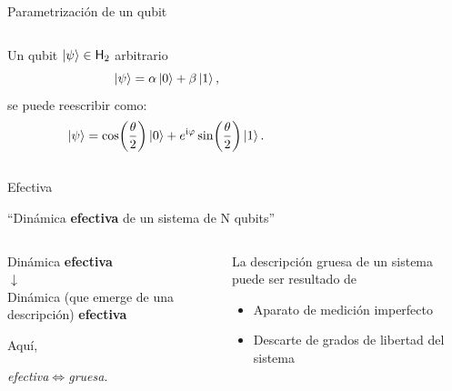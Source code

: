 \begin{frame}{Parametrización de un qubit}
    \begin{columns}
        \begin{column}{0.5\textwidth}
            Un qubit $\ket{\psi}\in{\sf H}_{2}$ arbitrario
            \begin{equation}
                \ket{\psi}=\alpha\ket{0}+\beta\ket{1},\nonumber
            \end{equation}
            \pause
            se puede reescribir como:
            \begin{equation}
                \ket{\psi}=\cos(\frac{\theta}{2})\ket{0}+e^{\text{i}\varphi}\sin(\frac{\theta}{2})\ket{1}.\nonumber
            \end{equation}
        \end{column}
        \begin{column}{0.5\textwidth}
            \centering
            \BlochSphere
        \end{column}
    \end{columns}
\end{frame}



\begin{frame}{Efectiva}
    \begin{center}
        ``Dinámica \textbf{efectiva} de un sistema de N qubits''
    \end{center}
    \pause
    \begin{columns}
        \begin{column}{0.5\textwidth}
            \begin{center}
                Dinámica \textbf{efectiva}\\
                \pause
                $\downarrow$\\
                Dinámica {\tiny(que emerge de una descripción)} \textbf{efectiva}
            \end{center}
            \pause
            Aquí, 
            \begin{center}
                \textit{efectiva}$\iff$\textit{gruesa}.
            \end{center}
        \end{column}
        \pause
        \begin{column}{0.5\textwidth}
            La descripción gruesa de un sistema puede ser resultado de
            \begin{itemize}
                \item Aparato de medición imperfecto
                \item Descarte de grados de libertad del sistema
            \end{itemize}
        \end{column}
    \end{columns}
\end{frame}

